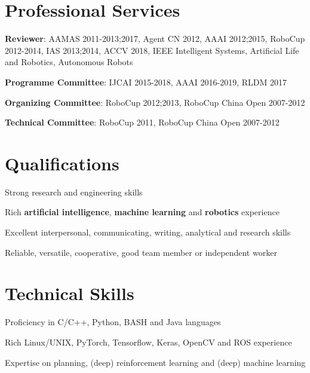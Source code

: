 \documentclass[letterpaper, fontset=adobe, 10pt]{ctexart}
\def\footerlink{}
\renewenvironment{itemize}{
  \begin{list}{}{
    \setlength{\leftmargin}{1.5em}
  }
}{
  \end{list}
}
\begin{document}
\vspace{20pt}
\section*{Professional Services}
\begin{itemize}
	\item {\bf Reviewer}: AAMAS 2011-2013;2017, Agent CN 2012, AAAI 2012;2015, RoboCup 2012-2014, IAS 2013;2014, ACCV 2018, IEEE Intelligent Systems, Artificial Life and Robotics, Autonomous Robots
	\item {\bf Programme Committee}: IJCAI 2015-2018, AAAI 2016-2019, RLDM 2017
	\item {\bf Organizing Committee}: RoboCup 2012;2013, RoboCup China Open 2007-2012
	\item {\bf Technical Committee}: RoboCup 2011, RoboCup China Open 2007-2012
\end{itemize}

\vspace{20pt}
\section*{Qualifications}
\begin{itemize} 
	\item Strong research and engineering skills
	\item Rich {\bf artificial intelligence}, {\bf machine learning} and {\bf robotics} experience
	\item Excellent interpersonal, communicating, writing, analytical and research skills
	\item Reliable, versatile, cooperative, good team member or independent worker
\end{itemize}

\vspace{20pt}
\section*{Technical Skills}
\begin{itemize}
	\item Proficiency in C/C++, Python, BASH and Java languages
	\item Rich Linux/UNIX, PyTorch, Tensorflow, Keras, OpenCV and ROS experience
	\item Expertise on planning, (deep) reinforcement learning and (deep) machine learning
\end{itemize}

\bigskip

\end{document}
